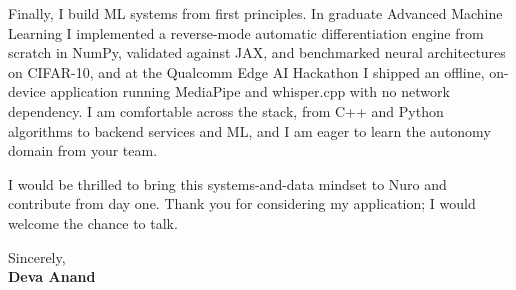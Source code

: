 \documentclass[letterpaper,11pt]{article}
\begin{document}
Finally, I build ML systems from first principles. In graduate Advanced Machine Learning I implemented a reverse-mode automatic differentiation engine from scratch in NumPy, validated against JAX, and benchmarked neural architectures on CIFAR-10, and at the Qualcomm Edge AI Hackathon I shipped an offline, on-device application running MediaPipe and whisper.cpp with no network dependency. I am comfortable across the stack, from C++ and Python algorithms to backend services and ML, and I am eager to learn the autonomy domain from your team.

I would be thrilled to bring this systems-and-data mindset to Nuro and contribute from day one. Thank you for considering my application; I would welcome the chance to talk.

\vspace{6pt}
Sincerely, \\
\textbf{Deva Anand}
\end{document}

